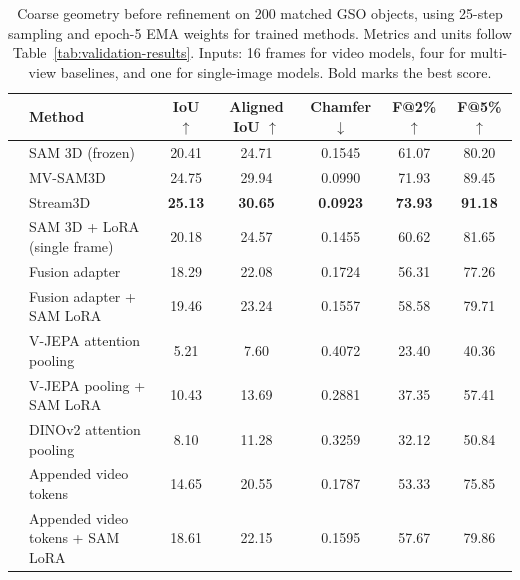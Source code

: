 \documentclass{article}
\begin{document}
\begin{table}[t]
\centering
\scriptsize
\setlength{\tabcolsep}{2pt}
\begin{tabular*}{\textwidth}{@{\extracolsep{\fill}}l|lccccc@{}}
\toprule
 & Method & IoU $\uparrow$ & Aligned IoU $\uparrow$ & Chamfer $\downarrow$ & F@2\% $\uparrow$ & F@5\% $\uparrow$ \\
\midrule
{} & SAM 3D (frozen) & 20.41 & 24.71 & 0.1545 & 61.07 & 80.20 \\
 & MV-SAM3D & 24.75 & 29.94 & 0.0990 & 71.93 & 89.45 \\
 & Stream3D & \textbf{25.13} & \textbf{30.65} & \textbf{0.0923} & \textbf{73.93} & \textbf{91.18} \\
\midrule
{} & SAM 3D + LoRA (single frame) & 20.18 & 24.57 & 0.1455 & 60.62 & 81.65 \\
 & Fusion adapter & 18.29 & 22.08 & 0.1724 & 56.31 & 77.26 \\
 & Fusion adapter + SAM LoRA & 19.46 & 23.24 & 0.1557 & 58.58 & 79.71 \\
 & V-JEPA attention pooling & 5.21 & 7.60 & 0.4072 & 23.40 & 40.36 \\
 & V-JEPA pooling + SAM LoRA & 10.43 & 13.69 & 0.2881 & 37.35 & 57.41 \\
 & DINOv2 attention pooling & 8.10 & 11.28 & 0.3259 & 32.12 & 50.84 \\
 & Appended video tokens & 14.65 & 20.55 & 0.1787 & 53.33 & 75.85 \\
 & Appended video tokens + SAM LoRA & 18.61 & 22.15 & 0.1595 & 57.67 & 79.86 \\
\bottomrule
\end{tabular*}
\caption{Coarse geometry before refinement on 200 matched GSO objects, using 25-step sampling and epoch-5 EMA weights for trained methods. Metrics and units follow Table~\ref{tab:validation-results}. Inputs: 16 frames for video models, four for multi-view baselines, and one for single-image models. Bold marks the best score.}
\label{tab:gso-coarse-results}
\label{tab:gso-results}
\end{table}
\end{document}
